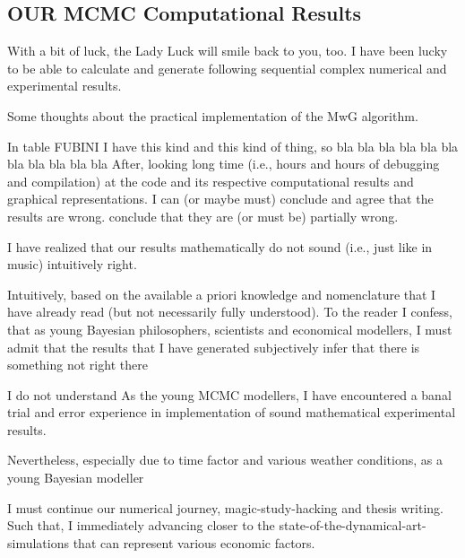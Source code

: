 \documentclass[a4paper,11pt,english]{article}
\begin{document}
		\subsection{OUR MCMC Computational Results}

		With a bit of luck, the Lady Luck will smile back to you, too. I have been lucky to be able to calculate and generate following sequential 
		complex numerical and experimental results.
		
		\noindent Some thoughts about the practical implementation of the MwG algorithm.
		
		
		
		In table FUBINI I have this kind and this kind of thing, so bla bla bla bla bla bla bla bla bla bla bla		
		After, looking long time (i.e., hours and hours of debugging and compilation) at the code and its respective computational results and graphical 
		representations. I can (or maybe must) conclude and agree that the results are wrong. 
		conclude that they are (or must be) partially wrong. 
		
		
		I have realized that our results mathematically do not sound (i.e., just like in music) intuitively right. 
		
		Intuitively,
		based on the available a priori knowledge and nomenclature that I have already read (but not necessarily fully understood). To the reader I 
		confess, that as young Bayesian philosophers, 
		scientists and economical modellers, I must admit that the results that I have generated  
		subjectively infer that there is something not right there
		
		I do not understand   
		As the young MCMC modellers, I have encountered a banal trial and error experience in implementation of sound mathematical experimental results.
		
		Nevertheless, especially due to time factor and various weather conditions, as a young Bayesian modeller  
		
		
		I must continue our numerical journey, magic-study-hacking and thesis writing. Such that, I immediately 
		advancing closer to the state-of-the-dynamical-art-simulations  			that can represent various economic factors.
		
\end{document}
